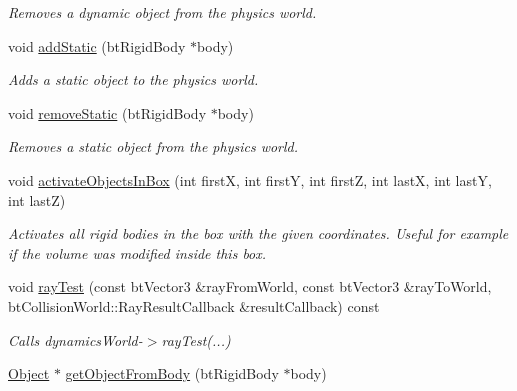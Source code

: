 \begin{DoxyCompactItemize}
\begin{DoxyCompactList}\small\item\em \-Removes a dynamic object from the physics world. \end{DoxyCompactList}\item 
\hypertarget{classPhysics_a0e90b954e53aaf8693a292379a435534}{
void \hyperlink{classPhysics_a0e90b954e53aaf8693a292379a435534}{add\-Static} (bt\-Rigid\-Body $\ast$body)}
\label{d4/d2d/classPhysics_a0e90b954e53aaf8693a292379a435534}

\begin{DoxyCompactList}\small\item\em \-Adds a static object to the physics world. \end{DoxyCompactList}\item 
\hypertarget{classPhysics_ae6533c95865251e8f690c0843ede59d3}{
void \hyperlink{classPhysics_ae6533c95865251e8f690c0843ede59d3}{remove\-Static} (bt\-Rigid\-Body $\ast$body)}
\label{d4/d2d/classPhysics_ae6533c95865251e8f690c0843ede59d3}

\begin{DoxyCompactList}\small\item\em \-Removes a static object from the physics world. \end{DoxyCompactList}\item 
\hypertarget{classPhysics_aab4c3c0c6a3180b995f24e5bc035e679}{
void \hyperlink{classPhysics_aab4c3c0c6a3180b995f24e5bc035e679}{activate\-Objects\-In\-Box} (int first\-X, int first\-Y, int first\-Z, int last\-X, int last\-Y, int last\-Z)}
\label{d4/d2d/classPhysics_aab4c3c0c6a3180b995f24e5bc035e679}

\begin{DoxyCompactList}\small\item\em \-Activates all rigid bodies in the box with the given coordinates. \-Useful for example if the volume was modified inside this box. \end{DoxyCompactList}\item 
\hypertarget{classPhysics_adc70eee1d1fa72512fe500efe481f4c5}{
void \hyperlink{classPhysics_adc70eee1d1fa72512fe500efe481f4c5}{ray\-Test} (const bt\-Vector3 \&ray\-From\-World, const bt\-Vector3 \&ray\-To\-World, bt\-Collision\-World\-::\-Ray\-Result\-Callback \&result\-Callback) const }
\label{d4/d2d/classPhysics_adc70eee1d1fa72512fe500efe481f4c5}

\begin{DoxyCompactList}\small\item\em \-Calls dynamics\-World-\/$>$ray\-Test(...) \end{DoxyCompactList}\item 
\hypertarget{classPhysics_a643be9878aa896a426db9ba7ebc763e4}{
\hyperlink{classObject}{\-Object} $\ast$ \hyperlink{classPhysics_a643be9878aa896a426db9ba7ebc763e4}{get\-Object\-From\-Body} (bt\-Rigid\-Body $\ast$body)}
\label{d4/d2d/classPhysics_a643be9878aa896a426db9ba7ebc763e4}


\end{DoxyCompactItemize}
